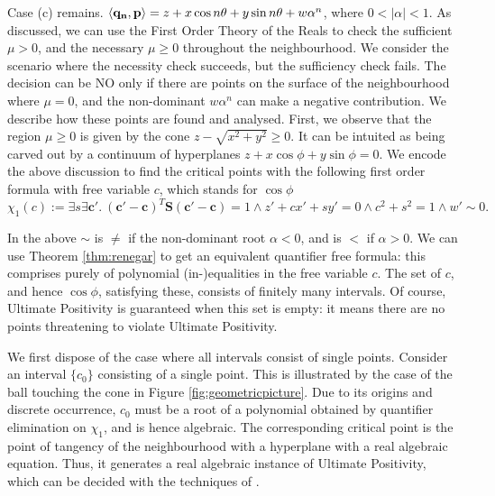 
Case (c) remains. $\langle\mathbf{q_n}, \mathbf{p}\rangle = z + x\cos n\theta + y\sin n\theta + w\alpha^n$, where $0 < |\alpha| < 1$. As discussed, we can use the First Order Theory of the Reals to check the sufficient $\mu > 0$, and the necessary $\mu \ge 0$ throughout the neighbourhood. We consider the scenario where the necessity check succeeds, but the sufficiency check fails. The decision can be NO only if there are points on the surface of the neighbourhood where $\mu = 0$, and the non-dominant $w\alpha^n$ can make a negative contribution. We describe how these points are found and analysed. First, we observe that the region $\mu \ge 0$ is given by the cone $z - \sqrt{x^2 + y^2} \ge 0$. It can be intuited as being carved out by a continuum of hyperplanes $z + x\cos\phi + y\sin\phi = 0$. We encode the above discussion to find the critical points with the following first order formula with free variable $c$, which stands for $\cos \phi$
\begin{equation}
\label{eq:intersection}
\chi_1(c):= \exists s \exists \mathbf{c'}.~ (\mathbf{c'} - \mathbf{c})^T\mathbf{S}(\mathbf{c'} - \mathbf{c}) = 1 \land z' + cx' + sy' = 0 \land c^2 + s^2 = 1 \land w' \sim 0.
\end{equation}

In the above $\sim$ is $\ne$ if the non-dominant root $\alpha < 0$, and is $<$ if $\alpha > 0$. We can use Theorem \ref{thm:renegar} to get an equivalent quantifier free formula: this comprises purely of polynomial (in-)equalities in the free variable $c$. The set of $c$, and hence $\cos \phi$, satisfying these, consists of finitely many intervals. Of course, Ultimate Positivity is guaranteed when this set is empty: it means there are no points threatening to violate Ultimate Positivity.

We first dispose of the case where all intervals consist of single points. Consider an interval $\{c_0\}$ consisting of a single point. This is illustrated by the case of the ball touching the cone in Figure \ref{fig:geometricpicture}. Due to its origins and discrete occurrence, $c_0$ must be a root of a polynomial obtained by quantifier elimination on $\chi_1$, and is hence algebraic. The corresponding critical point is the point of tangency of the neighbourhood with a hyperplane with a real algebraic equation. Thus, it generates a real algebraic instance of Ultimate Positivity, which can be decided with the techniques of \cite{ouaknine2014ultimate}.

